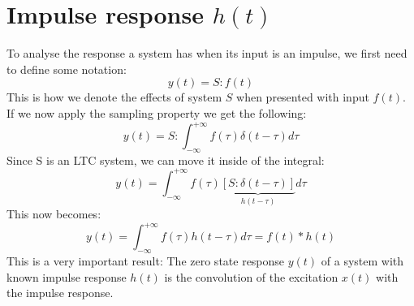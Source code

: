 \documentclass[]{subfiles}
\begin{document}
	\section{Impulse response $h(t)$}
	To analyse the response a system has when its input is an impulse, we first need to define some notation:
	\begin{equation}
		y(t) = S:f(t)
	\end{equation}
	This is how we denote the effects of  system $S$ when presented with input $f(t)$.   If we now apply the sampling property we get the following:
	\begin{equation}
		y(t)=S:\int_{-\infty}^{+\infty}f(\tau)\delta(t-\tau)d\tau
	\end{equation}
	Since S is an LTC system, we can move it inside of the integral:
	\begin{equation}
		y(t)=\int_{-\infty}^{+\infty}f(\tau)\underbrace{\left[ S:\delta(t-\tau)\right] }_{h(t-\tau)}d\tau
	\end{equation}
	This now becomes:
	\begin{equation}
		y(t)=\int_{-\infty}^{+\infty}f(\tau)h(t-\tau)d\tau=f(t)\ast h(t)
	\end{equation}
	This is a very important result: The zero  state  response  $y(t)$  of  a system  with  known  impulse  response $ h(t)$  is  the convolution of the excitation $x(t)$  with the impulse response. 
\end{document}
